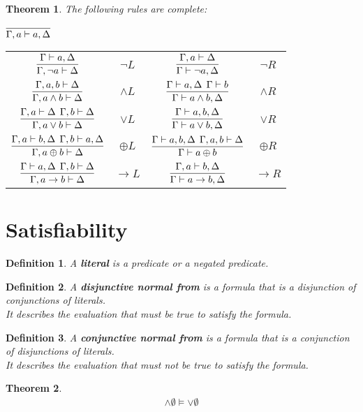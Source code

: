 \documentclass{article}
\theoremstyle{sltheorem}
\newtheorem{definition}{Definition}
\newtheorem{theorem}{Theorem}
\begin{document}
\begin{theorem}
    The following rules are complete:
    \begin{center}
        $\infer{\Gamma, a \vdash a, \Delta}{}$\\
    {\renewcommand{\arraystretch}{3}
    \begin{tabular}{c c c c}
           $\vcenter{\infer{\Gamma,\neg a\vdash \Delta}{\Gamma\vdash a, \Delta}}$ 
           &$\neg L$
           &$\vcenter{\infer{\Gamma\vdash \neg a, \Delta}{\Gamma, a\vdash \Delta}}$ 
           &$\neg R$\\
           $\vcenter{\infer{\Gamma, a\wedge b\vdash \Delta}{\Gamma, a, b\vdash \Delta}}$ 
           &$\wedge L$
           &$\vcenter{\infer{\Gamma\vdash a\wedge b, \Delta}{\Gamma\vdash a, \Delta\:\: \Gamma\vdash b}}$ 
           &$\wedge R$\\
           $\vcenter{\infer{\Gamma, a\vee b\vdash \Delta}{\Gamma,a\vdash \Delta\:\:\Gamma,b\vdash\Delta}}$ 
           &$\vee L$
           &$\vcenter{\infer{\Gamma\vdash a\vee b,\Delta}{\Gamma\vdash a,b,\Delta}}$ 
           &$\vee R$\\
           $\vcenter{\infer{\Gamma, a\oplus b\vdash\Delta}{\Gamma, a\vdash b, \Delta\:\:\Gamma, b\vdash a,\Delta}}$
           &$\oplus L$
           &$\vcenter{\infer{\Gamma\vdash a\oplus b}{\Gamma\vdash a,b,\Delta\:\:\Gamma,a,b\vdash \Delta}}$
           &$\oplus R$\\
           $\vcenter{\infer{\Gamma, a\to b\vdash \Delta}{\Gamma\vdash a,\Delta\:\:\Gamma, b\vdash \Delta}}$
           &$\to L$
           &$\vcenter{\infer{\Gamma\vdash a\to b, \Delta}{\Gamma,a\vdash b,\Delta}}$
           &$\to R$
    \end{tabular}
    }
    \end{center}
\end{theorem}
\section{Satisfiability}
\begin{definition}
    A \textbf{literal} is a predicate or a negated predicate.
\end{definition}
\begin{definition}
    A \textbf{disjunctive normal from} is a formula that is a disjunction of conjunctions of literals.\\
    It describes the evaluation that must be true to satisfy the formula.
\end{definition}
\begin{definition}
    A \textbf{conjunctive normal from} is a formula that is a conjunction of disjunctions of literals.\\
    It describes the evaluation that must not be true to satisfy the formula.
\end{definition}
\begin{theorem}
    \begin{gather*}
        \wedge \emptyset\vDash\vee\emptyset
    \end{gather*}
\end{theorem}
\end{document}
